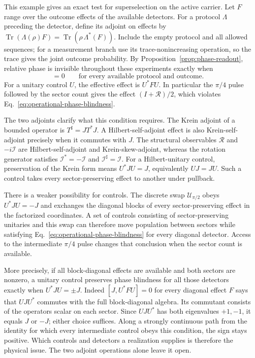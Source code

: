 \documentclass[11pt]{article}
\theoremstyle{definition}
\DeclareMathOperator{\Tr}{Tr}
\begin{document}
This example gives an exact test for superselection on the active carrier. Let $F$ range over the outcome effects of the available detectors. For a protocol $\Lambda$ preceding the detector, define its adjoint on effects by $\Tr(\Lambda(\rho)F)=\Tr(\rho\,\Lambda^*(F))$. Include the empty protocol and all allowed sequences; for a measurement branch use its trace-nonincreasing operation, so the trace gives the joint outcome probability. By Proposition~\ref{prop:phase-readout}, relative phase is invisible throughout these experiments exactly when
\begin{equation}
 [J,\Lambda^*(F)]=0\qquad\text{for every available protocol and outcome.}
 \label{eq:operational-phase-blindness}
\end{equation}
For a unitary control $U$, the effective effect is $U^*FU$. In particular the $\pi/4$ pulse followed by the sector count gives the effect $(I+\mathcal R)/2$, which violates Eq.~\eqref{eq:operational-phase-blindness}.

The two adjoints clarify what this condition requires. The Krein adjoint of a bounded operator is $T^\sharp=JT^*J$. A Hilbert-self-adjoint effect is also Krein-self-adjoint precisely when it commutes with $J$. The structural observables $\mathcal R$ and $-i\mathcal I$ are Hilbert-self-adjoint and Krein-skew-adjoint, whereas the rotation generator satisfies $\mathcal I^*=-\mathcal I$ and $\mathcal I^\sharp=\mathcal I$. For a Hilbert-unitary control, preservation of the Krein form means $U^*JU=J$, equivalently $UJ=JU$. Such a control takes every sector-preserving effect to another under pullback.

There is a weaker possibility for controls. The discrete swap $\mathcal U_{\pi/2}$ obeys $U^*JU=-J$ and exchanges the diagonal blocks of every sector-preserving effect in the factorized coordinates. A set of controls consisting of sector-preserving unitaries and this swap can therefore move population between sectors while satisfying Eq.~\eqref{eq:operational-phase-blindness} for every diagonal detector. Access to the intermediate $\pi/4$ pulse changes that conclusion when the sector count is available.

More precisely, if all block-diagonal effects are available and both sectors are nonzero, a unitary control preserves phase blindness for all those detectors exactly when $U^*JU=\pm J$. Indeed $[J,U^*FU]=0$ for every diagonal effect $F$ says that $UJU^*$ commutes with the full block-diagonal algebra. Its commutant consists of the operators scalar on each sector. Since $UJU^*$ has both eigenvalues $+1,-1$, it equals $J$ or $-J$; either choice suffices. Along a strongly continuous path from the identity for which every intermediate control obeys this condition, the sign stays positive. Which controls and detectors a realization supplies is therefore the physical issue. The two adjoint operations alone leave it open.
\end{document}
